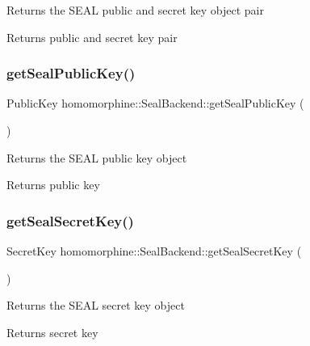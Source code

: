 Returns the S\+E\+AL public and secret key object pair

\begin{DoxyReturn}{Returns}
public and secret key pair 
\end{DoxyReturn}
\mbox{\label{classhomomorphine_1_1_seal_backend_ae643453f9f2b82beb532a98253ef13d7}} 
\subsubsection{\texorpdfstring{getSealPublicKey()}{getSealPublicKey()}}
{\footnotesize\ttfamily Public\+Key homomorphine\+::\+Seal\+Backend\+::get\+Seal\+Public\+Key (\begin{DoxyParamCaption}{ }\end{DoxyParamCaption})}

Returns the S\+E\+AL public key object

\begin{DoxyReturn}{Returns}
public key 
\end{DoxyReturn}
\mbox{\label{classhomomorphine_1_1_seal_backend_a37bae1b8c7ce56871bc597bb334018a5}} 
\subsubsection{\texorpdfstring{getSealSecretKey()}{getSealSecretKey()}}
{\footnotesize\ttfamily Secret\+Key homomorphine\+::\+Seal\+Backend\+::get\+Seal\+Secret\+Key (\begin{DoxyParamCaption}{ }\end{DoxyParamCaption})}

Returns the S\+E\+AL secret key object

\begin{DoxyReturn}{Returns}
secret key 
\end{DoxyReturn}
\mbox{\label{classhomomorphine_1_1_seal_backend_a8ad57a68eb8a02d162ba439046565471}} 
